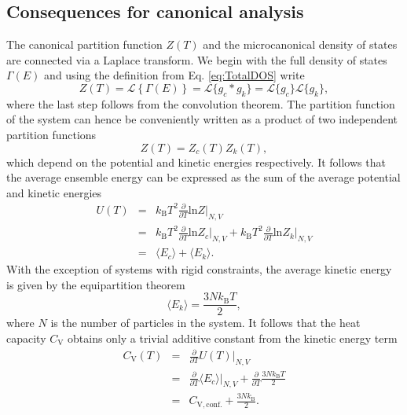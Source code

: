 \documentclass[12pt]{report}
\begin{document}
\subsection{Consequences for canonical analysis}
The canonical partition function $Z(T)$ and the microcanonical density of states are connected via a Laplace transform. We begin with the full density of states $\Gamma(E)$ and using the definition from Eq. \ref{eq:TotalDOS} write
\begin{equation}
\label{eq:Laplace}
Z(T) = \mathcal{L}\left\lbrace\Gamma(E)\right\rbrace = \mathcal{L}\{g_{c} \ast g_{k} \} = \mathcal{L}\{g_{c}\} \mathcal{L}\{g_{k}\},
\end{equation}
where the last step follows from the convolution theorem\cite{Arfken}. 
\newpage
\noindent
The partition function of the system can hence be conveniently written as a product of two independent partition functions
\begin{equation}
Z(T) = Z_{c}(T)Z_{k}(T),
\end{equation}
which depend on the potential and kinetic energies respectively. It follows that the average ensemble energy can be expressed as the sum of the average potential and kinetic energies
\begin{eqnarray}
U(T)  &=& k_{\mathrm{B}}T^{2}\frac{\partial}{\partial T} \mathrm{ln} Z\bigg|_{N,V} \nonumber \\
	 &=& k_{\mathrm{B}}T^{2}\frac{\partial}{\partial T} \mathrm{ln} Z_{c} \bigg|_{N,V}	 + k_{\mathrm{B}}T^{2}\frac{\partial}{\partial T} \mathrm{ln} Z_{k} \bigg|_{N,V}	 \nonumber \\
	 &=& \langle E_{c} \rangle + \langle E _{k}\rangle.  
\end{eqnarray}
With the exception of systems with rigid constraints, the average kinetic energy is given by the equipartition theorem 
\begin{equation}
 \langle E _{k}\rangle = \frac{3Nk_{\mathrm{B}}T}{2},
\end{equation}
where $N$ is the number of particles in the system. It follows that the heat capacity $C_{\mathrm{V}}$ obtains only a trivial additive constant from the kinetic energy term
\begin{eqnarray}
C_{\mathrm{V}}(T) &=& \frac{\partial}{\partial T} U(T)\bigg|_{N,V} \nonumber \\
				 &=& \frac{\partial}{\partial T} \langle E_{c} \rangle\bigg|_{N,V} + \frac{\partial}{\partial T}\frac{3Nk_{\mathrm{B}}T}{2} \nonumber \\
				 &=& C_{\mathrm{V},\mathrm{conf.}} + \frac{3Nk_{\mathrm{B}}}{2}.
\end{eqnarray}
\end{document}

